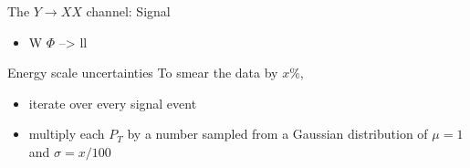 \documentclass[bigger]{beamer}
\begin{document}
\begin{frame}[label={sec:org0b803d6}]{The \(Y \rightarrow XX\) channel: Signal}
\begin{itemize}
\item W \(\Phi\) --> ll
\end{itemize}
\end{frame}

\begin{frame}[label={sec:org1d7d7ae}]{Energy scale uncertainties}
To smear the data by \(x\%\),
\begin{itemize}
\item iterate over every signal event
\item multiply each \(P_{T}\) by a number sampled from a Gaussian distribution of \(\mu = 1\) and \(\sigma = x/100\)
\end{itemize}
\end{frame}
\end{document}
